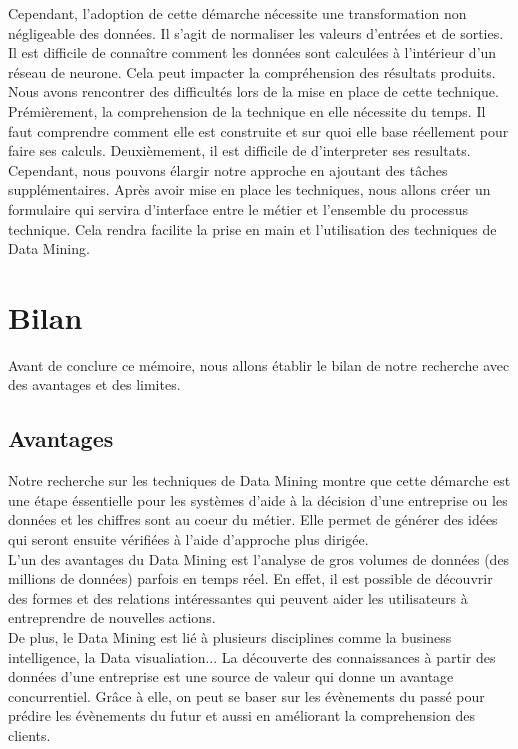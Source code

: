 \documentclass[11pt,a4paper]{report}
\begin{document}
Cependant, l'adoption de cette démarche nécessite une transformation non négligeable des données. Il s'agit de normaliser les valeurs d'entrées et de sorties. Il est difficile de connaître comment les données sont calculées à l'intérieur d'un réseau de neurone. Cela peut impacter la compréhension des résultats produits. Nous avons rencontrer des difficultés lors de la mise en place de cette technique. Prémièrement, la comprehension de la  technique en elle  nécessite du temps. Il faut comprendre comment elle est construite  et sur quoi elle base réellement pour faire ses calculs. Deuxièmement, il est difficile de d'interpreter ses resultats. \\
Cependant, nous pouvons élargir notre approche en ajoutant des tâches supplémentaires. Après avoir mise en place les techniques, nous allons créer un formulaire  qui servira d'interface entre le métier et l'ensemble du processus technique. Cela rendra facilite la prise en main et l'utilisation des techniques de Data Mining.

\newpage
\section{Bilan}
Avant de conclure ce mémoire, nous allons établir le bilan de notre recherche avec des avantages et des limites.   
\subsection{Avantages}
Notre recherche sur les techniques de Data Mining montre que cette démarche est une étape éssentielle pour les systèmes d'aide à la décision d'une entreprise ou les données et les chiffres sont au coeur du métier. Elle permet de générer des idées qui seront ensuite vérifiées à l'aide d'approche plus dirigée. \\

L'un des avantages du Data Mining est l'analyse de gros volumes de données (des millions de données) parfois en temps réel. En effet, il est possible de découvrir des formes et des relations intéressantes qui peuvent aider les utilisateurs  à entreprendre de nouvelles actions.\\

De plus, le Data Mining est lié à plusieurs disciplines comme la business intelligence, la Data visualiation... La découverte des connaissances  à partir des données d'une entreprise est une source de valeur qui donne un avantage concurrentiel. Grâce à elle, on peut se baser sur les évènements du passé pour prédire les évènements du futur et aussi en améliorant la comprehension des clients. \\
\end{document}
